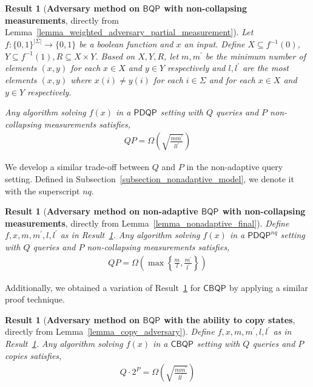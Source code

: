 \documentclass[10pt,a4paper]{article}
\newcommand{\queryamount}[0]{\ensuremath{Q}\xspace}
\newcommand{\abilityamount}[0]{\ensuremath{P}\xspace} %
\newcommand{\nonadaptivelabel}[0]{\ensuremath{nq}\xspace}
\newcommand{\compclass}[2][]{\ensuremath{\mathsf{#2}^{#1}}\xspace}
\newcommand{\pdqpname}[0]{\compclass{PDQP}}
\newcommand{\pdqpnaqname}[0]{\compclass[\nonadaptivelabel]{PDQP}}
\newcommand{\bqpname}[0]{\compclass{BQP}}
\newcommand{\copybqpname}[0]{\compclass{CBQP}}
\newtheorem{result}[theorem]{Result}
\begin{document}
\begin{result}[\textbf{Adversary method on \bqpname with non-collapsing measurements}, directly from Lemma~\ref{lemma_weighted_adversary_partial_measurement}]\label{result_adversary}
    Let $f:\{0,1\}^{|\Sigma|}\rightarrow \{0,1\}$ be a boolean function and $x$ an input.
    Define $X\subseteq f^{-1}(0)$, $Y\subseteq f^{-1}(1), R\subseteq X\times Y$. Based on $X,Y, R$, let $m, m^\prime$ be the minimum number of elements $(x,y)$ for each $x\in X$ and $y\in Y$ respectively and $l,l^{\prime}$ are the most elements $(x,y)$ where $x(i)\neq y(i)$ for each $i\in\Sigma$ and for each $x\in X$ and $y\in Y$ respectively.

    Any algorithm solving $f(x)$ in a \pdqpname setting with \queryamount queries and \abilityamount non-collapsing measurements satisfies,
    \begin{align*}
        \queryamount \abilityamount = \Omega \left( \sqrt{\frac{mm^\prime}{ll^\prime}} \right)
    \end{align*}
\end{result}

We develop a similar trade-off between \queryamount and \abilityamount in the non-adaptive query setting. Defined in Subsection~\ref{subsection_nonadaptive_model}, we denote it with the superscript \nonadaptivelabel.

\begin{result}[\textbf{Adversary method on non-adaptive \bqpname with non-collapsing measurements}, directly from Lemma~\ref{lemma_nonadaptive_final}]
    Define $f, x, m, m^\prime, l, l^\prime$ as in Result~\ref{result_adversary}. Any algorithm solving $f(x)$ in a \pdqpnaqname setting with \queryamount queries and \abilityamount non-collapsing measurements satisfies,
    \begin{align*}
        \queryamount \abilityamount = \Omega \left(\max \left\{ \frac{m}{l}, \frac{m^\prime}{l^\prime} \right\} \right)
    \end{align*}
\end{result}

Additionally, we obtained a variation of Result~\ref{result_adversary} for \copybqpname by applying a similar proof technique.

\begin{result}[\textbf{Adversary method on \bqpname with the ability to copy states}, directly from Lemma~\ref{lemma_copy_adversary}]\label{result_copy}
    Define $f, x, m, m^\prime, l, l^\prime$ as in Result~\ref{result_adversary}. Any algorithm solving $f(x)$ in a \copybqpname setting with \queryamount queries and \abilityamount copies satisfies,
    \begin{align*}
        Q \cdot 2^P = \Omega \left( \sqrt{\frac{mm^\prime}{ll^\prime}} \right)
    \end{align*}
\end{result}
\end{document}
